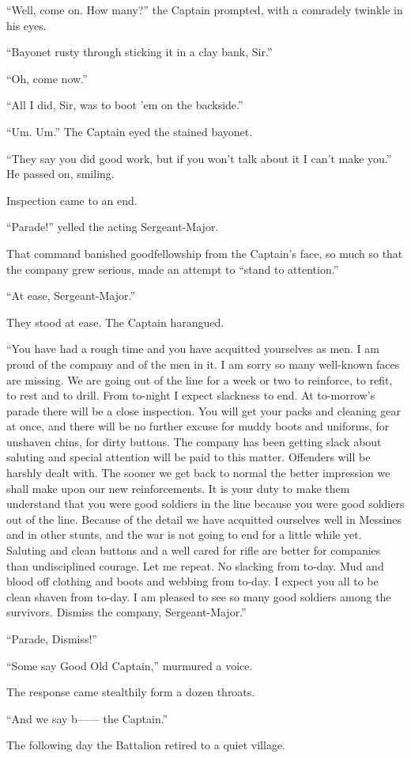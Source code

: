 ``Well, come on. How many?'' the Captain prompted, with a comradely twinkle in his eyes.

``Bayonet rusty through sticking it in a clay bank, Sir.''

``Oh, come now.''

``All I did, Sir, was to boot 'em on the backside.''

``Um. Um.'' The Captain eyed the stained bayonet.

``They say you did good work, but if you won't talk about it I can't make you.'' He passed on, smiling.

Inspection came to an end.

``Parade!'' yelled the acting Sergeant-Major.

That command banished goodfellowship from the Captain's face, so much so that the company grew serious, made an attempt to ``stand to attention.''

``At ease, Sergeant-Major.''

They stood at ease. The Captain harangued.

``You have had a rough time and you have acquitted yourselves as men. I am proud of the company and of the men in it. I am sorry so many well-known faces are missing. We are going out of the line for a week or two to reinforce, to refit, to rest and to drill. From to-night I expect slackness to end. At to-morrow's parade there will be a close inspection. You will get your packs and cleaning gear at once, and there will be no further excuse for muddy boots and uniforms, for unshaven chins, for dirty buttons. The company has been getting slack about saluting and special attention will be paid to this matter. Offenders will be harshly dealt with. The sooner we get back to normal the better impression we shall make upon our new reinforcements. It is your duty to make them understand that you were good soldiers in the line because you were good soldiers out of the line. Because of the detail we have acquitted ourselves well in Messines and in other stunts, and the war is not going to end for a little while yet. Saluting and clean buttons and a well cared for rifle are better for companies than undisciplined courage. Let me repeat. No slacking from to-day. Mud and blood off clothing and boots and webbing from to-day. I expect you all to be clean shaven from to-day. I am pleased to see so many good soldiers among the survivors. Dismiss the company, Sergeant-Major.''

``Parade, Dismiss!''

``Some say Good Old Captain,'' murmured a voice.

The response came stealthily form a dozen throats.

``And we say b------ the Captain.''

The following day the Battalion retired to a quiet village.


